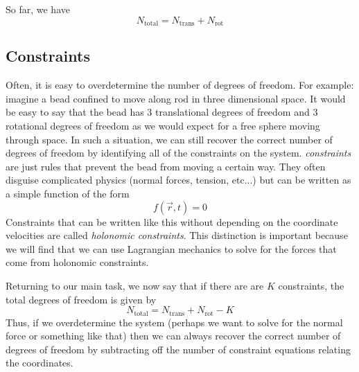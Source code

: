 \documentclass{article}
\begin{document}
So far, we have
\begin{equation}
  N_{\textrm{total}} = N_{\textrm{trans}} + N_{\textrm{rot}}
\end{equation}


\subsection*{Constraints}
Often, it is easy to overdetermine the number of degrees of freedom. For
example: imagine a bead confined to move along rod in three dimensional space.
It would be easy to say that the bead has 3 translational degrees of freedom and
3 rotational degrees of freedom as we would expect for a free sphere moving
through space. In such a situation, we can still recover the correct number of
degrees of freedom by identifying all of the constraints on the system.
\textit{constraints} are just rules that prevent the bead from moving a certain
way. They often disguise complicated physics (normal forces, tension,
etc...) but can be written as a simple function of the form
\begin{equation}
  f(\vec{r}, t) = 0
\end{equation}
Constraints that can be written like this without depending on the coordinate
velocities are called \textit{holonomic constraints}. This distinction is
important because we will find that we can use Lagrangian mechanics to solve for
the forces that come from holonomic constraints. 


Returning to our main task, we now say that if there are are $K$ constraints,
the total degrees of freedom is given by
\begin{equation}
  N_{\textrm{total}} =  N_{\textrm{trans}} + N_{\textrm{rot}}-K
\end{equation}
Thus, if we overdetermine the system (perhaps we want to solve for the normal
force or something like that) then we can always recover the correct number of
degrees of freedom by subtracting off the number of constraint equations
relating the coordinates. 
\end{document}
